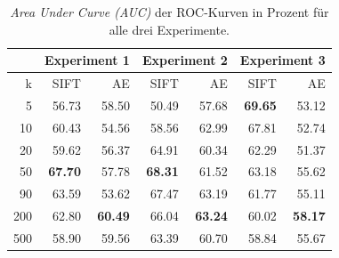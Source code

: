 \begin{table}[!htb]
\centering
\begin{tabular}[t]{|r|r|r|r|r|r|r|}
	\hline
       & \multicolumn{2}{|c|}{Experiment 1} & \multicolumn{2}{|c|}{Experiment 2} & \multicolumn{2}{|c|}{Experiment 3} \\ \hline
      k & SIFT    & AE      & SIFT    & AE      & SIFT    & AE      \\ \hline     
      5 & 56.73 & 58.50 & 50.49 & 57.68 & \textbf{69.65} & 53.12 \\ \hline
     10 & 60.43 & 54.56 & 58.56 & 62.99 & 67.81 & 52.74 \\ \hline
  	 20 & 59.62 & 56.37 & 64.91 & 60.34 & 62.29 & 51.37 \\ \hline
 	 50 & \textbf{67.70} & 57.78 & \textbf{68.31} & 61.52 & 63.18 & 55.62 \\ \hline
	 90 & 63.59 & 53.62 & 67.47 & 63.19 & 61.77 & 55.11 \\ \hline
	200 & 62.80 & \textbf{60.49} & 66.04 & \textbf{63.24} & 60.02 & \textbf{58.17} \\ \hline
	500 & 58.90 & 59.56 & 63.39 & 60.70 & 58.84 & 55.67 \\ \hline
\end{tabular}
\caption{\textit{Area Under Curve (AUC)} der ROC-Kurven in Prozent für alle drei Experimente.}
\label{tab:AUC}
\end{table}

